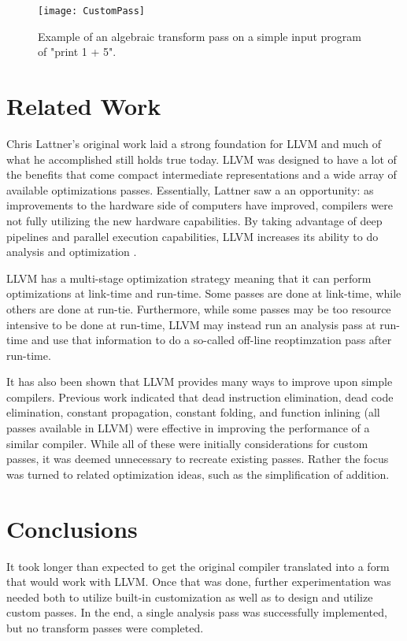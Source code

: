 \begin{figure}
\texttt{[image: CustomPass]}
\caption{Example of an algebraic transform pass on a simple input program of "print 1 + 5".}
\end{figure}

\section{Related Work}

Chris Lattner's original work laid a strong foundation for LLVM and much of what he accomplished still holds true today. LLVM was designed to have a lot of the benefits that come compact intermediate representations and a wide array of available optimizations passes. Essentially, Lattner saw a an opportunity: as improvements to the hardware side of computers have improved, compilers were not fully utilizing the new hardware capabilities. By taking advantage of deep pipelines and parallel execution capabilities, LLVM increases its ability to do analysis and optimization \cite{Lattner07}.

LLVM has a multi-stage optimization strategy meaning that it can perform optimizations at link-time and run-time. Some passes are done at link-time, while others are done at run-tie. Furthermore, while some passes may be too resource intensive to be done at run-time, LLVM may instead run an analysis pass at run-time and use that information to do a so-called off-line reoptimzation pass after run-time\cite{Lattner07}.

It has also been shown that LLVM provides many ways to improve upon simple compilers. Previous work indicated that dead instruction elimination, dead code elimination, constant propagation, constant folding, and function inlining (all passes available in LLVM) were effective in improving the performance of a similar compiler. While all of these were initially considerations for custom passes, it was deemed unnecessary to recreate existing passes. Rather the focus was turned to related optimization ideas, such as the simplification of addition\cite{Cox09}. 



\section{Conclusions}

It took longer than expected to get the original compiler translated into a form that would work with LLVM. Once that was done, further experimentation was needed both to utilize built-in customization as well as to design and utilize custom passes. In the end, a single analysis pass was successfully implemented, but no transform passes were completed.

